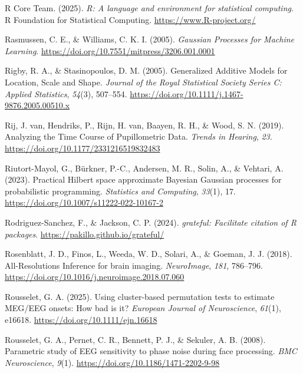 \documentclass[
  doc,
  floatsintext,
  longtable,
  a4paper,
  nolmodern,
  notxfonts,
  notimes,
  colorlinks=true,linkcolor=blue,citecolor=blue,urlcolor=blue]{apa7}
\newlength{\cslhangindent}
\newenvironment{CSLReferences}[2] %
 {\begin{list}{}{%
  \setlength{\itemindent}{0pt}
  \setlength{\leftmargin}{0pt}
  \setlength{\parsep}{0pt}
  \ifodd #1
   \setlength{\leftmargin}{\cslhangindent}
   \setlength{\itemindent}{-1\cslhangindent}
  \fi
  \setlength{\itemsep}{#2\baselineskip}}}
 {\end{list}}
\begin{document}
\begin{CSLReferences}{1}{0}
R Core Team. (2025). \emph{{R}: A language and environment for
statistical computing}. R Foundation for Statistical Computing.
\url{https://www.R-project.org/}

Rasmussen, C. E., \& Williams, C. K. I. (2005). \emph{Gaussian Processes
for Machine Learning}.
\url{https://doi.org/10.7551/mitpress/3206.001.0001}

Rigby, R. A., \& Stasinopoulos, D. M. (2005). Generalized Additive
Models for Location, Scale and Shape. \emph{Journal of the Royal
Statistical Society Series C: Applied Statistics}, \emph{54}(3),
507--554. \url{https://doi.org/10.1111/j.1467-9876.2005.00510.x}

Rij, J. van, Hendriks, P., Rijn, H. van, Baayen, R. H., \& Wood, S. N.
(2019). Analyzing the Time Course of Pupillometric Data. \emph{Trends in
Hearing}, \emph{23}. \url{https://doi.org/10.1177/2331216519832483}

Riutort-Mayol, G., Bürkner, P.-C., Andersen, M. R., Solin, A., \&
Vehtari, A. (2023). Practical {Hilbert} space approximate {Bayesian
Gaussian} processes for probabilistic programming. \emph{Statistics and
Computing}, \emph{33}(1), 17.
\url{https://doi.org/10.1007/s11222-022-10167-2}

Rodriguez-Sanchez, F., \& Jackson, C. P. (2024). \emph{{grateful}:
Facilitate citation of {R} packages}.
\url{https://pakillo.github.io/grateful/}

Rosenblatt, J. D., Finos, L., Weeda, W. D., Solari, A., \& Goeman, J. J.
(2018). All-Resolutions Inference for brain imaging. \emph{NeuroImage},
\emph{181}, 786--796.
\url{https://doi.org/10.1016/j.neuroimage.2018.07.060}

Rousselet, G. A. (2025). Using cluster-based permutation tests to
estimate {MEG}/{EEG} onsets: {How} bad is it? \emph{European Journal of
Neuroscience}, \emph{61}(1), e16618.
\url{https://doi.org/10.1111/ejn.16618}

Rousselet, G. A., Pernet, C. R., Bennett, P. J., \& Sekuler, A. B.
(2008). Parametric study of EEG sensitivity to phase noise during face
processing. \emph{BMC Neuroscience}, \emph{9}(1).
\url{https://doi.org/10.1186/1471-2202-9-98}


\end{CSLReferences}
\end{document}
